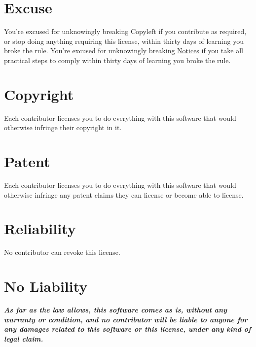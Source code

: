 \documentclass[12pt,letterpaper]{article}
\begin{document}
\section*{Excuse}

You're excused for unknowingly breaking
Copyleft if you contribute as required, or
stop doing anything requiring this license, within thirty days of
learning you broke the rule. You're excused for unknowingly breaking
\hyperlink{Notices}{Notices} if you take all practical steps to
comply within thirty days of learning you broke the rule.

\section*{Copyright}

Each contributor licenses you to do everything with this software that
would otherwise infringe their copyright in it.

\section*{Patent}

Each contributor licenses you to do everything with this software that
would otherwise infringe any patent claims they can license or become
able to license.

\section*{Reliability}

No contributor can revoke this license.

\section*{No Liability}

\textbf{\emph{As far as the law allows, this software comes as is,
without any warranty or condition, and no contributor will be liable to
anyone for any damages related to this software or this license, under
any kind of legal claim.}}
\end{document}
